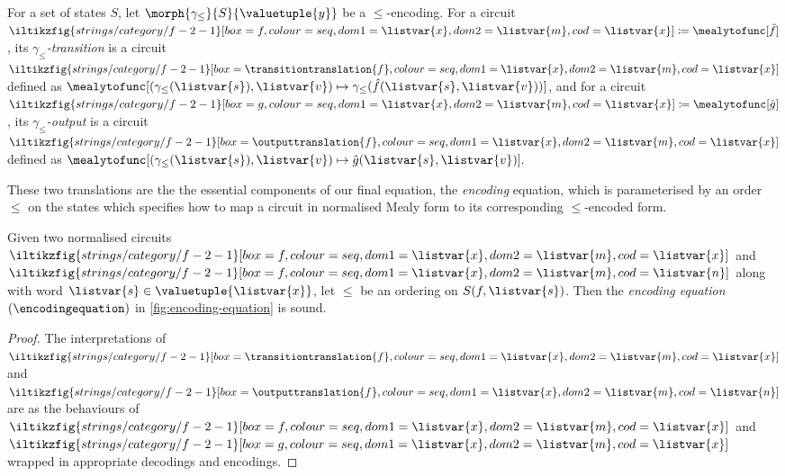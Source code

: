 \begin{definition}[Translations]
    For a set of states \(S\), let \(\morph{\gamma_\leq}{S}{\valuetuple{y}}\) be
    a \(\leq\)-encoding.
    For a circuit \(
        \iltikzfig{strings/category/f-2-1}[box=f, colour=seq, dom1=\listvar{x}, dom2=\listvar{m}, cod=\listvar{x}]
        \coloneqq
        \mealytofunc[\hat{f}]
    \), its \emph{\(\gamma_\leq\)-transition} is a circuit \(
        \iltikzfig{strings/category/f-2-1}[box=\transitiontranslation{f}, colour=seq, dom1=\listvar{x}, dom2=\listvar{m}, cod=\listvar{x}]
    \) defined as \(
        \mealytofunc[
            \left(\gamma_\leq(\listvar{s}),\listvar{v}\right)
            \mapsto \gamma_\leq(\hat{f}(\listvar{s}, \listvar{v}))
        ]
    \), and for a circuit \(
        \iltikzfig{strings/category/f-2-1}[box=g, colour=seq, dom1=\listvar{x}, dom2=\listvar{m}, cod=\listvar{x}]
        \coloneqq
        \mealytofunc[\hat{g}]
    \), its \emph{\(\gamma_\leq\)-output} is a circuit \(
        \iltikzfig{strings/category/f-2-1}[box=\outputtranslation{f}, colour=seq, dom1=\listvar{x}, dom2=\listvar{m}, cod=\listvar{x}]
    \) defined as \(
        \mealytofunc[
            \left(\gamma_\leq(\listvar{s}),\listvar{v}\right)
            \mapsto \hat{g}(\listvar{s}, \listvar{v})
        ].
    \)
\end{definition}

These two translations are the the essential components of our final equation,
the \emph{encoding} equation, which is parameterised by an order \(\leq\) on the
states which specifies how to map a circuit in normalised Mealy form to
its corresponding \(\leq\)-encoded form.

\begin{proposition}\label{prop:encoding-equation}
    Given two normalised circuits \(
        \iltikzfig{strings/category/f-2-1}[box=f,colour=seq,dom1=\listvar{x},dom2=\listvar{m},cod=\listvar{x}]
    \) and \(
        \iltikzfig{strings/category/f-2-1}[box=f,colour=seq,dom1=\listvar{x},dom2=\listvar{m},cod=\listvar{n}]
    \) along with word \(\listvar{s} \in \valuetuple{\listvar{x}}\), let
    \(\leq\) be an ordering on \(S(f,\listvar{s})\).
    Then the \emph{encoding equation} \((\encodingequation)\) in
    \cref{fig:encoding-equation} is sound.
\end{proposition}
\begin{proof}
    The interpretations of \(
            \iltikzfig{strings/category/f-2-1}[box={\transitiontranslation{f}},colour=seq,dom1=\listvar{x},dom2=\listvar{m},cod=\listvar{x}]
        \) and \(
            \iltikzfig{strings/category/f-2-1}[box={\outputtranslation{f}},colour=seq,dom1=\listvar{x},dom2=\listvar{m},cod=\listvar{n}]
        \) are as the behaviours of \(
            \iltikzfig{strings/category/f-2-1}[box={f},colour=seq,dom1=\listvar{x},dom2=\listvar{m},cod=\listvar{x}]
        \) and \(
            \iltikzfig{strings/category/f-2-1}[box={g},colour=seq,dom1=\listvar{x},dom2=\listvar{m},cod=\listvar{x}]
        \) wrapped in appropriate decodings and encodings.
\end{proof}

